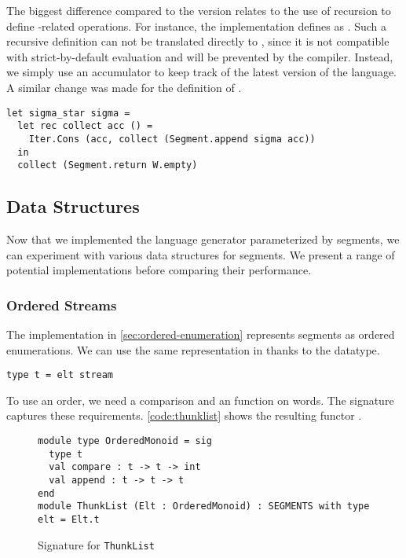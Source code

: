 The biggest difference compared to the \haskell version relates to the use
of recursion to define -related operations.
For instance, the \haskell implementation defines  as
. Such a recursive definition
can not be translated directly to \ocaml, since it is not compatible with
strict-by-default evaluation and will be prevented by the compiler.
Instead, we simply use an accumulator to keep track of the latest version
of the language.
A similar change was made for the definition of .
\begin{lstlisting}
let sigma_star sigma =
  let rec collect acc () =
    Iter.Cons (acc, collect (Segment.append sigma acc))
  in
  collect (Segment.return W.empty)
\end{lstlisting}


\subsection{Data Structures}

Now that we implemented the language generator parameterized by segments, we can
experiment with various data structures for segments. We present a
range of potential implementations before comparing their performance.

\subsubsection{Ordered Streams}

The \haskell implementation in \autoref{sec:ordered-enumeration}
represents segments as ordered enumerations. We can use
the same representation in \ocaml thanks to the  datatype.
\begin{lstlisting}[numbers=none]
type t = elt stream
\end{lstlisting}

To use an order, we need a comparison and an
 function on words.  The  signature
captures these requirements. \autoref{code:thunklist} shows the
resulting functor .

\begin{figure}[hbt]
  \centering
\begin{lstlisting}
module type OrderedMonoid = sig
  type t
  val compare : t -> t -> int
  val append : t -> t -> t
end
module ThunkList (Elt : OrderedMonoid) : SEGMENTS with type elt = Elt.t
\end{lstlisting}
  \caption{Signature for \texttt{ThunkList}}
  \label{code:thunklist}
\end{figure}

